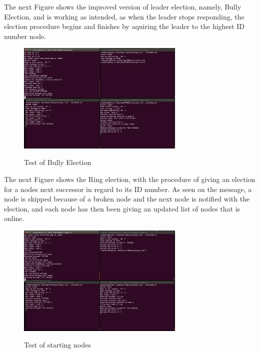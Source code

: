 The next Figure shows the improved version of leader election, namely, Bully Election, and is working as intended, as when the leader stops responding, the election procedure begins and finishes by aquiring the leader to the highest ID number node.

\begin{figure}[ht!]
\centering
\caption{Test of Bully Election}
\includegraphics[width=80mm]{img/bully_election_messages.png}
\label{Test of Bully Election}
\end{figure}

The next Figure shows the Ring election, with the procedure of giving an election for a nodes next successor in regard to its ID number. As seen on the message, a node is skipped because of a broken node and the next node is notified with the election, and each node has then been giving an updated list of nodes that is online.

\begin{figure}[ht!]
\centering
\caption{Test of starting nodes}
\includegraphics[width=80mm]{img/ring_election_messages.png}
\label{Test of Ring Election}
\end{figure}











